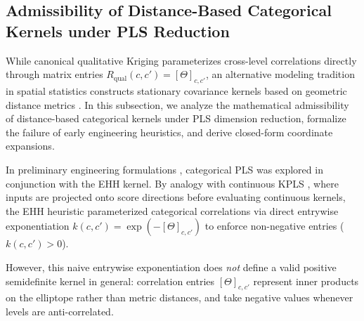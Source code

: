 \documentclass[default,sn-mathphys,Numbered]{sn-jnl}
\theoremstyle{thmstyleone}
\theoremstyle{thmstylethree}
\theoremstyle{thmstyletwo}
\begin{document}
\subsection{Admissibility of Distance-Based Categorical Kernels under PLS Reduction}
\label{subsec:cat_kernels}\label{subsec:admissible_kernels}

While canonical qualitative Kriging parameterizes cross-level correlations directly through matrix entries $R_{\mathrm{qual}}(c, c') = [\Theta]_{c, c'}$, an alternative modeling tradition in spatial statistics constructs stationary covariance kernels based on geometric distance metrics \citep{williams2006gaussian,Bouhlel18,Roustant}. In this subsection, we analyze the mathematical admissibility of distance-based categorical kernels under PLS dimension reduction, formalize the failure of early engineering heuristics, and derive closed-form coordinate expansions.

In preliminary engineering formulations \citep{saves2023high,Mixed_Paul}, categorical PLS was explored in conjunction with the EHH kernel. By analogy with continuous KPLS \citep{bouhlel_KPLSK,Bouhlel18}, where inputs are projected onto score directions before evaluating continuous kernels, the EHH heuristic parameterized categorical correlations via direct entrywise exponentiation $k(c, c') = \exp(-[\Theta]_{c, c'})$ to enforce non-negative entries ($k(c, c') > 0$).

However, this naive entrywise exponentiation does \textit{not} define a valid positive semidefinite kernel in general: correlation entries $[\Theta]_{c, c'}$ represent inner products on the elliptope rather than metric distances, and take negative values whenever levels are anti-correlated.
\end{document}
